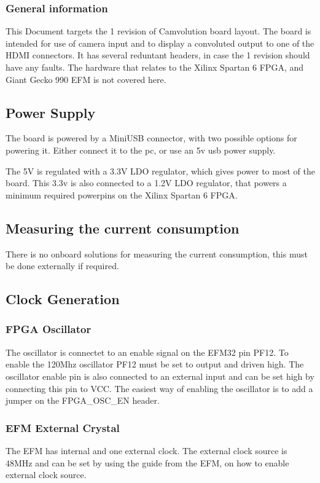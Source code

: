 \subsubsection{General information}
This Document targets the 1 revision of Camvolution board layout. The board is intended for use of camera input and to display a convoluted output to one of the HDMI connectors. It has several reduntant headers, in case the 1 revision should have any faults. The hardware that relates to the Xilinx Spartan 6 FPGA, and Giant Gecko 990 EFM is not covered here.

\subsection{Power Supply}
The board is powered by a MiniUSB connector, with two possible options for powering it. Either connect it to the pc, or use an 5v usb power supply.

The 5V is regulated with a 3.3V LDO regulator, which gives power to most of the board. This 3.3v is also connected to a 1.2V LDO regulator, that powers a minimum required powerpins on the Xilinx Spartan 6 FPGA. 

\subsection{Measuring the current consumption}
There is no onboard solutions for measuring the current consumption, this must be done externally if required. 

\subsection{Clock Generation}
\subsubsection{FPGA Oscillator}The oscillator is connectet to an enable signal on the EFM32 pin PF12. To enable the 120Mhz oscillator PF12 must be set to output and driven high. The oscillator enable pin is also connected to an external input and can be set high by connecting this pin to VCC. The easiest way of enabling the oscillator is to add a jumper on the FPGA\_OSC\_EN header.
\newline
\subsubsection{EFM External Crystal}
The EFM has internal and one external clock. The external clock source is 48MHz and can be set by using the guide from the EFM, on how to enable external clock source. 
